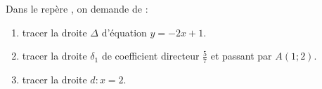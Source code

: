 
Dans le repère \Oij, on demande de : 
\begin{enumerate}
\item tracer la droite $\Delta$ d'équation $y=-2x+1$.
\item tracer la droite $\delta_1$ de coefficient directeur $\frac{5}{7}$ et passant par $A(1;2)$.
\item tracer la droite $d:x=2$.
\end{enumerate}